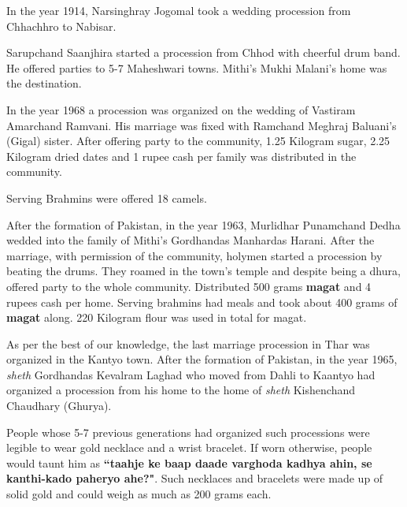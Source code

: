 In the year 1914, Narsinghray Jogomal took a wedding procession from Chhachhro
to Nabisar.

Sarupchand Saanjhira started a procession from Chhod with cheerful drum band.
He offered parties to 5-7 Maheshwari towns. Mithi's Mukhi Malani's home was the
destination.

In the year 1968 a procession was organized on the wedding of Vastiram
Amarchand Ramvani. His marriage was fixed with Ramchand Meghraj Baluani's
(Gigal) sister. After offering party to the community, 1.25 Kilogram sugar,
2.25 Kilogram dried dates and 1 rupee cash per family was distributed in the
community.

Serving Brahmins were offered 18 camels.

After the formation of Pakistan, in the year 1963, Murlidhar Punamchand Dedha
wedded into the family of Mithi's Gordhandas Manhardas Harani. After the
marriage, with permission of the community, holymen started a procession by
beating the drums. They roamed in  the town's temple and despite being a dhura,
offered party to the whole community. Distributed 500 grams \textbf{magat} and 4
rupees cash per home. Serving brahmins had meals and took about 400 grams of
\textbf{magat} along. 220 Kilogram flour was used in total for magat.

As per the best of our knowledge, the last marriage procession in Thar was
organized in the Kantyo town. After the formation of Pakistan, in the year
1965, \textit{sheth} Gordhandas Kevalram Laghad who moved from Dahli to Kaantyo
had organized a procession from his home to the home of \textit{sheth}
Kishenchand Chaudhary (Ghurya).

People whose 5-7 previous generations had organized such processions were
legible to wear gold necklace and a wrist bracelet. If worn otherwise, people
would taunt him as \textbf{``taahje ke baap daade varghoda kadhya ahin, se
kanthi-kado paheryo ahe?"}. Such necklaces and bracelets were made up of solid
gold and could weigh as much as 200 grams each.

